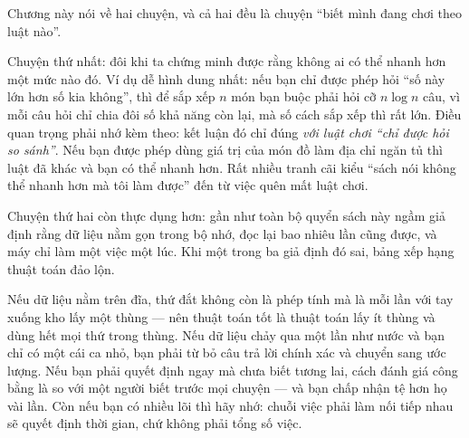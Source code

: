 \documentclass[../../algorithm.tex]{subfiles}
\begin{document}
\begin{dongian}
Chương này nói về hai chuyện, và cả hai đều là chuyện ``biết mình đang chơi theo luật nào''.

Chuyện thứ nhất: đôi khi ta chứng minh được rằng không ai có thể nhanh hơn một mức nào đó. Ví dụ dễ hình dung nhất: nếu bạn chỉ được phép hỏi ``số này lớn hơn số kia không'', thì để sắp xếp \(n\) món bạn buộc phải hỏi cỡ \(n\log n\) câu, vì mỗi câu hỏi chỉ chia đôi số khả năng còn lại, mà số cách sắp xếp thì rất lớn. Điều quan trọng phải nhớ kèm theo: kết luận đó chỉ đúng \emph{với luật chơi ``chỉ được hỏi so sánh''}. Nếu bạn được phép dùng giá trị của món đồ làm địa chỉ ngăn tủ thì luật đã khác và bạn có thể nhanh hơn. Rất nhiều tranh cãi kiểu ``sách nói không thể nhanh hơn mà tôi làm được'' đến từ việc quên mất luật chơi.

Chuyện thứ hai còn thực dụng hơn: gần như toàn bộ quyển sách này ngầm giả định rằng dữ liệu nằm gọn trong bộ nhớ, đọc lại bao nhiêu lần cũng được, và máy chỉ làm một việc một lúc. Khi một trong ba giả định đó sai, bảng xếp hạng thuật toán đảo lộn.

Nếu dữ liệu nằm trên đĩa, thứ đắt không còn là phép tính mà là mỗi lần với tay xuống kho lấy một thùng --- nên thuật toán tốt là thuật toán lấy ít thùng và dùng hết mọi thứ trong thùng. Nếu dữ liệu chảy qua một lần như nước và bạn chỉ có một cái ca nhỏ, bạn phải từ bỏ câu trả lời chính xác và chuyển sang ước lượng. Nếu bạn phải quyết định ngay mà chưa biết tương lai, cách đánh giá công bằng là so với một người biết trước mọi chuyện --- và bạn chấp nhận tệ hơn họ vài lần. Còn nếu bạn có nhiều lõi thì hãy nhớ: chuỗi việc phải làm nối tiếp nhau sẽ quyết định thời gian, chứ không phải tổng số việc.
\end{dongian}
\end{document}
